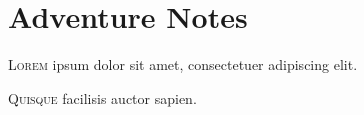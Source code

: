 \documentclass{scrbook}
\begin{document}



\chapter{Adventure Notes}
\lettrine{L}{orem} ipsum dolor sit amet, consectetuer adipiscing elit. \lipsum*[55]

\lettrine{Q}{uisque} facilisis auctor
sapien. \lipsum*[51]
\end{document}
